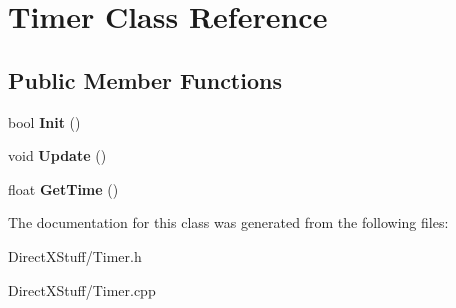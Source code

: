 \hypertarget{class_timer}{\section{Timer Class Reference}
\label{class_timer}
}
\subsection*{Public Member Functions}
\begin{DoxyCompactItemize}
\item 
\hypertarget{class_timer_ad573ab8552b70039f7a99322374ceee5}{bool {\bfseries Init} ()}\label{class_timer_ad573ab8552b70039f7a99322374ceee5}

\item 
\hypertarget{class_timer_a77a6595649759e7236d1b43c2c10e16b}{void {\bfseries Update} ()}\label{class_timer_a77a6595649759e7236d1b43c2c10e16b}

\item 
\hypertarget{class_timer_a3bb0f087deb92ce89270ebe5f5adbf13}{float {\bfseries Get\-Time} ()}\label{class_timer_a3bb0f087deb92ce89270ebe5f5adbf13}

\end{DoxyCompactItemize}


The documentation for this class was generated from the following files\-:\begin{DoxyCompactItemize}
\item 
Direct\-X\-Stuff/Timer.\-h\item 
Direct\-X\-Stuff/Timer.\-cpp\end{DoxyCompactItemize}

